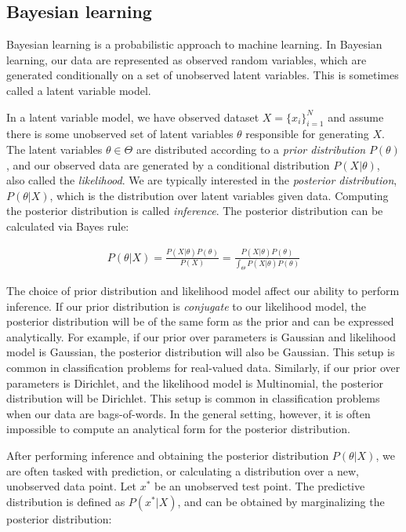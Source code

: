 \documentclass{article}
\begin{document}
\subsection{Bayesian learning}
Bayesian learning is a probabilistic
approach to machine learning.
In Bayesian learning, our data
are represented as observed random variables,
which are generated conditionally
on a set of unobserved latent variables.
This is sometimes called a latent variable model.

In a latent variable model,
we have observed dataset $X = \{x_i\}_{i = 1}^N$
and assume there is some
unobserved set of latent variables $\theta$
responsible for generating $X$.
The latent variables $\theta \in \Theta$
are distributed according
to a \emph{prior distribution} $P(\theta)$,
and our observed data
are generated by a conditional
distribution $P(X | \theta)$, also called
the \emph{likelihood}.
We are typically interested in the
\emph{posterior distribution},
$P(\theta | X)$, which is the distribution
over latent variables given data.
Computing the posterior distribution is called \emph{inference}.
The posterior distribution can be calculated
via Bayes rule:

\begin{align}
  P(\theta | X) = \frac{P(X | \theta)P(\theta)}{P(X)} = \frac{P(X | \theta)P(\theta)}{\int_\Theta P(X | \theta)P(\theta)}
\end{align}

The choice of prior distribution and likelihood model
affect our ability to perform inference.
If our prior distribution is \emph{conjugate}
to our likelihood model, the posterior distribution
will be of the same form as the prior
and can be expressed analytically.
For example, if our prior over parameters
is Gaussian and likelihood model is Gaussian,
the posterior distribution will also be Gaussian.
This setup is common in classification problems
for real-valued data.
Similarly, if our prior over parameters is Dirichlet,
and the likelihood model is Multinomial,
the posterior distribution will be Dirichlet.
This setup is common in classification problems
when our data are bags-of-words.
In the general setting, however,
it is often impossible to compute an
analytical form for the posterior distribution.

After performing inference and obtaining
the posterior distribution $P(\theta | X)$,
we are often tasked with prediction,
or calculating a distribution over a new, unobserved
data point. Let $x^*$ be an unobserved test point.
The predictive distribution is defined
as $P(x^* | X)$, and can be obtained by
marginalizing the posterior distribution:
\end{document}
